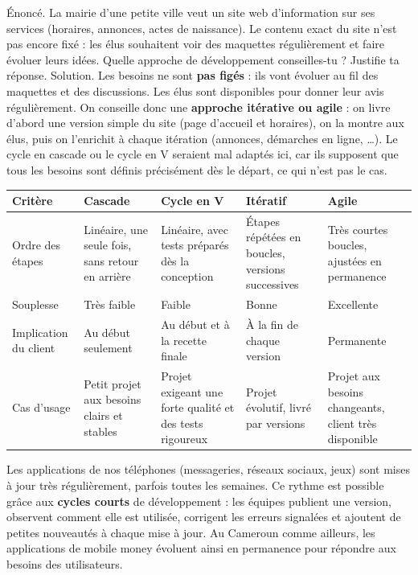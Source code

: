 \documentclass[11pt]{article}
\newcounter{popsec}
\newcounter{popsub}
\newcommand{\courssub}[1]{%
  \stepcounter{popsub}%
  \par\vspace{9pt}\noindent{\popxbold\fontsize{11.5}{13}\selectfont\color{popink}{\color{poporange}\thepopsec.\thepopsub}\hspace{6pt}#1}\par\nopagebreak\vspace{4pt}
}
\begin{document}
\begin{exoresolu}
Énoncé. La mairie d'une petite ville veut un site web d'information sur ses services (horaires, annonces, actes de naissance). Le contenu exact du site n'est pas encore fixé : les élus souhaitent voir des maquettes régulièrement et faire évoluer leurs idées. Quelle approche de développement conseilles-tu ? Justifie ta réponse.
\tcblower
Solution. Les besoins ne sont \textbf{pas figés} : ils vont évoluer au fil des maquettes et des discussions. Les élus sont disponibles pour donner leur avis régulièrement. On conseille donc une \textbf{approche itérative ou agile} : on livre d'abord une version simple du site (page d'accueil et horaires), on la montre aux élus, puis on l'enrichit à chaque itération (annonces, démarches en ligne, \ldots). Le cycle en cascade ou le cycle en V seraient mal adaptés ici, car ils supposent que tous les besoins sont définis précisément dès le départ, ce qui n'est pas le cas.
\end{exoresolu}

\courssub{Tableau comparatif des quatre approches}

\begin{center}
\begin{tabularx}{\linewidth}{|l|X|X|X|X|}
\hline
\rowcolor{popblueL} \textbf{Critère} & \textbf{Cascade} & \textbf{Cycle en V} & \textbf{Itératif} & \textbf{Agile} \\
\hline
Ordre des étapes & Linéaire, une seule fois, sans retour en arrière & Linéaire, avec tests préparés dès la conception & Étapes répétées en boucles, versions successives & Très courtes boucles, ajustées en permanence \\
\hline
Souplesse & Très faible & Faible & Bonne & Excellente \\
\hline
Implication du client & Au début seulement & Au début et à la recette finale & À la fin de chaque version & Permanente \\
\hline
Cas d'usage & Petit projet aux besoins clairs et stables & Projet exigeant une forte qualité et des tests rigoureux & Projet évolutif, livré par versions & Projet aux besoins changeants, client très disponible \\
\hline
\end{tabularx}
\end{center}

\begin{savaistu}
Les applications de nos téléphones (messageries, réseaux sociaux, jeux) sont mises à jour très régulièrement, parfois toutes les semaines. Ce rythme est possible grâce aux \textbf{cycles courts} de développement : les équipes publient une version, observent comment elle est utilisée, corrigent les erreurs signalées et ajoutent de petites nouveautés à chaque mise à jour. Au Cameroun comme ailleurs, les applications de mobile money évoluent ainsi en permanence pour répondre aux besoins des utilisateurs.
\end{savaistu}
\end{document}
